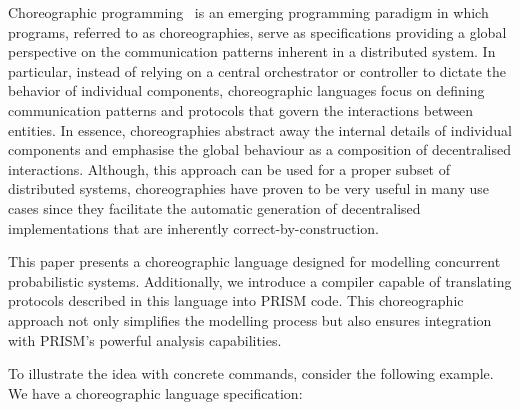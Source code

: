 Choreographic programming~\cite{M23} is an emerging programming
paradigm in which programs, referred to as choreographies, serve as
specifications providing a global perspective on the communication
patterns inherent in a distributed system. 
%
In particular, instead of relying on a central orchestrator or
controller to dictate the behavior of individual components,
choreographic languages focus on defining communication patterns and
protocols that govern the interactions between entities.
%
In essence, choreographies abstract away the internal details of
individual components and emphasise the global behaviour as a
composition of decentralised interactions. %
%
%
Although, this approach can be used for a proper subset of distributed
systems, choreographies have proven to be very useful in many use
cases since they facilitate the automatic generation of decentralised
implementations that are inherently correct-by-construction.
%

This paper presents a choreographic language designed for modelling
concurrent probabilistic systems.
Additionally, we introduce a compiler capable of translating protocols
described in this language into PRISM code. This choreographic
approach not only simplifies the modelling process but also ensures
integration with PRISM's powerful analysis capabilities. 

To illustrate the idea with concrete commands, consider the following example. We have a choreographic language specification: 


